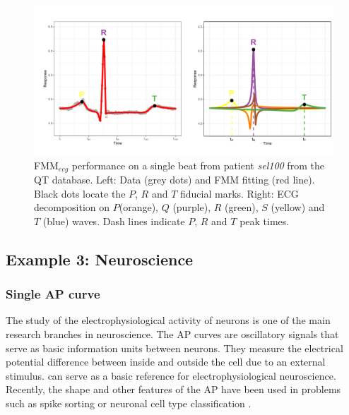 \begin{figure}[htbp]
\includegraphics[width=1\textwidth]{Figure_ECG_Example.pdf}
      \caption{FMM$_{ecg}$ performance on a single beat from patient \textit{sel100} from the QT database. Left: Data (grey dots) and FMM fitting (red line). Black dots locate the $P$, $R$ and $T$ fiducial marks. Right: ECG decomposition on $P$(orange), $Q$ (purple), $R$ (green), $S$ (yellow) and $T$ (blue) waves. Dash lines indicate $P$, $R$ and $T$ peak times.} \label{f:ecg}
\end{figure}

\subsection{Example 3: Neuroscience}\label{subsec:exNeuro}
\subsubsection{Single AP curve}\label{subsubsec:singleAP}
The study of the electrophysiological activity of neurons is one of the main research branches in neuroscience. The AP curves are oscillatory signals that serve as basic information units between neurons. They measure the electrical potential difference between inside and outside the cell due to an external stimulus. \cite{Gerstner+Kistler+Naud+Paninski:2014} can serve as a basic reference for electrophysiological neuroscience. Recently, the shape and other features of the AP have been used in problems such as spike sorting \citep{Racz+Liber+Nemeth+Fiath+Rokai+Harmati+Ulbert+Marton:2020, Souza+Lopes+Bacelo+Tort:2019, Caro+Delgado+Gruart+Sanchez:2018} or neuronal cell type classification \citep{Teeter+Iyer+Menon+al:2018, Gouwens+Sorense+Berg+al:2019, Mosher+Wei+Kaminski+Nandi+Mamelak+Anastassiou+Rutishauser:2020, RodriguezCollado+Rueda:2021b}.


